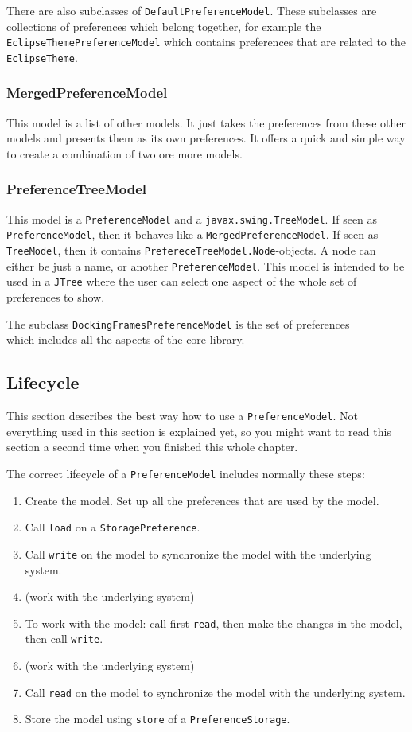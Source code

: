 \documentclass[a4paper,10pt]{article}
\newcommand{\src}[1]{\lstinline[basicstyle=\normalsize\ttfamily,keywordstyle=\normalsize\ttfamily,identifierstyle=\normalsize\ttfamily]|#1|}
\begin{document}
There are also subclasses of \src{DefaultPreferenceModel}. These subclasses are collections of preferences which belong together, for example the \\\src{EclipseThemePreferenceModel} which contains preferences that are related to the \src{EclipseTheme}.

\subsubsection{MergedPreferenceModel}
This model is a list of other models. It just takes the preferences from these other models and presents them as its own preferences. It offers a quick and simple way to create a combination of two ore more models.

\subsubsection{PreferenceTreeModel}
This model is a \src{PreferenceModel} and a \src{javax.swing.TreeModel}. If seen as \src{PreferenceModel}, then it behaves like a \src{MergedPreferenceModel}. If seen as \src{TreeModel}, then it contains \src{PrefereceTreeModel.Node}-objects. A node can either be just a name, or another \src{PreferenceModel}. This model is intended to be used in a \src{JTree} where the user can select one aspect of the whole set of preferences to show.

The subclass \src{DockingFramesPreferenceModel} is the set of preferences \\which includes all the aspects of the core-library.

\subsection{Lifecycle}
This section describes the best way how to use a \src{PreferenceModel}. Not everything used in this section is explained yet, so you might want to read this section a second time when you finished this whole chapter.

The correct lifecycle of a \src{PreferenceModel} includes normally these steps:
\begin{enumerate}
 \item Create the model. Set up all the preferences that are used by the model.
 \item Call \src{load} on a \src{StoragePreference}.
 \item Call \src{write} on the model to synchronize the model with the underlying system.
 \item (work with the underlying system)
 \item To work with the model: call first \src{read}, then make the changes in the model, then call \src{write}.
 \item (work with the underlying system)
 \item Call \src{read} on the model to synchronize the model with the underlying system.
 \item Store the model using \src{store} of a \src{PreferenceStorage}.
\end{enumerate}
\end{document}
